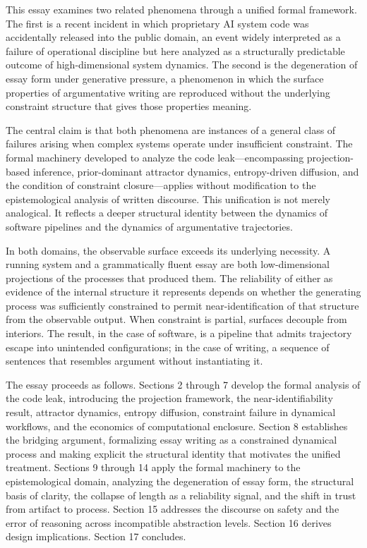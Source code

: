 \documentclass[12pt, oneside]{article}
\theoremstyle{plain}
\theoremstyle{definition}
\theoremstyle{remark}
\begin{document}
This essay examines two related phenomena through a unified formal framework. The first is
a recent incident in which proprietary AI system code was accidentally released into the
public domain, an event widely interpreted as a failure of operational discipline but here
analyzed as a structurally predictable outcome of high-dimensional system dynamics. The second
is the degeneration of essay form under generative pressure, a phenomenon in which the surface
properties of argumentative writing are reproduced without the underlying constraint structure
that gives those properties meaning.

The central claim is that both phenomena are instances of a general class of failures arising
when complex systems operate under insufficient constraint. The formal machinery developed to
analyze the code leak---encompassing projection-based inference, prior-dominant attractor
dynamics, entropy-driven diffusion, and the condition of constraint closure---applies without
modification to the epistemological analysis of written discourse. This unification is not
merely analogical. It reflects a deeper structural identity between the dynamics of software
pipelines and the dynamics of argumentative trajectories.

In both domains, the observable surface exceeds its underlying necessity. A running system and
a grammatically fluent essay are both low-dimensional projections of the processes that
produced them. The reliability of either as evidence of the internal structure it represents
depends on whether the generating process was sufficiently constrained to permit
near-identification of that structure from the observable output. When constraint is partial,
surfaces decouple from interiors. The result, in the case of software, is a pipeline that
admits trajectory escape into unintended configurations; in the case of writing, a sequence
of sentences that resembles argument without instantiating it.

The essay proceeds as follows. Sections 2 through 7 develop the formal analysis of the code
leak, introducing the projection framework, the near-identifiability result, attractor
dynamics, entropy diffusion, constraint failure in dynamical workflows, and the economics of
computational enclosure. Section 8 establishes the bridging argument, formalizing essay
writing as a constrained dynamical process and making explicit the structural identity that
motivates the unified treatment. Sections 9 through 14 apply the formal machinery to the
epistemological domain, analyzing the degeneration of essay form, the structural basis of
clarity, the collapse of length as a reliability signal, and the shift in trust from artifact
to process. Section 15 addresses the discourse on safety and the error of reasoning across
incompatible abstraction levels. Section 16 derives design implications. Section 17 concludes.
\end{document}
